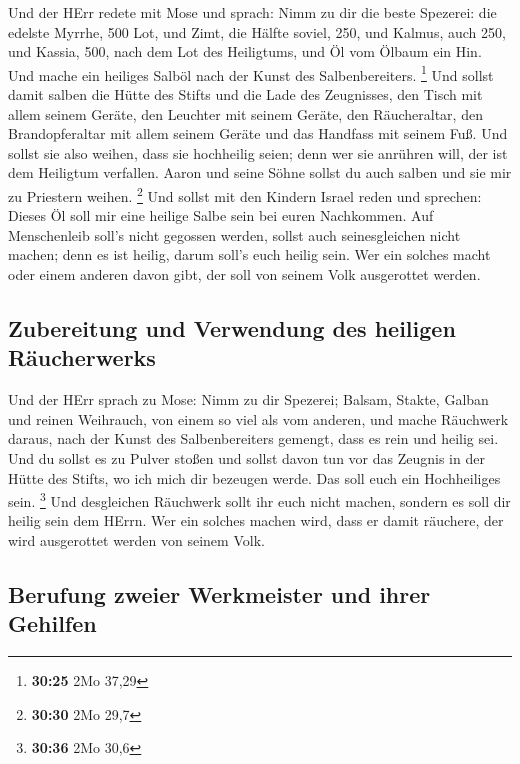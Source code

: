  Und der HErr redete mit Mose und sprach: 
Nimm zu dir die beste Spezerei: die edelste Myrrhe, 500 Lot, und Zimt,
die Hälfte soviel, 250, und Kalmus, auch 250,  und
Kassia, 500, nach dem Lot des Heiligtums, und Öl vom Ölbaum ein Hin.
 Und mache ein heiliges Salböl nach der Kunst des
Salbenbereiters. \footnote{\textbf{30:25} 2Mo 37,29}  Und
sollst damit salben die Hütte des Stifts und die Lade des Zeugnisses,
 den Tisch mit allem seinem Geräte, den Leuchter mit
seinem Geräte, den Räucheraltar,  den Brandopferaltar mit
allem seinem Geräte und das Handfass mit seinem Fuß.  Und
sollst sie also weihen, dass sie hochheilig seien; denn wer sie anrühren
will, der ist dem Heiligtum verfallen.  Aaron und seine
Söhne sollst du auch salben und sie mir zu Priestern weihen. \footnote{\textbf{30:30}
  2Mo 29,7}  Und sollst mit den Kindern Israel reden und
sprechen: Dieses Öl soll mir eine heilige Salbe sein bei euren
Nachkommen.  Auf Menschenleib soll's nicht gegossen
werden, sollst auch seinesgleichen nicht machen; denn es ist heilig,
darum soll's euch heilig sein.  Wer ein solches macht
oder einem anderen davon gibt, der soll von seinem Volk ausgerottet
werden.

\hypertarget{zubereitung-und-verwendung-des-heiligen-ruxe4ucherwerks}{%
\subsection{Zubereitung und Verwendung des heiligen
Räucherwerks}\label{zubereitung-und-verwendung-des-heiligen-ruxe4ucherwerks}}

 Und der HErr sprach zu Mose: Nimm zu dir Spezerei;
Balsam, Stakte, Galban und reinen Weihrauch, von einem so viel als vom
anderen,  und mache Räuchwerk daraus, nach der Kunst des
Salbenbereiters gemengt, dass es rein und heilig sei. 
Und du sollst es zu Pulver stoßen und sollst davon tun vor das Zeugnis
in der Hütte des Stifts, wo ich mich dir bezeugen werde. Das soll euch
ein Hochheiliges sein. \footnote{\textbf{30:36} 2Mo 30,6}
 Und desgleichen Räuchwerk sollt ihr euch nicht machen,
sondern es soll dir heilig sein dem HErrn.  Wer ein
solches machen wird, dass er damit räuchere, der wird ausgerottet werden
von seinem Volk.

\hypertarget{berufung-zweier-werkmeister-und-ihrer-gehilfen}{%
\subsection{Berufung zweier Werkmeister und ihrer
Gehilfen}\label{berufung-zweier-werkmeister-und-ihrer-gehilfen}}

